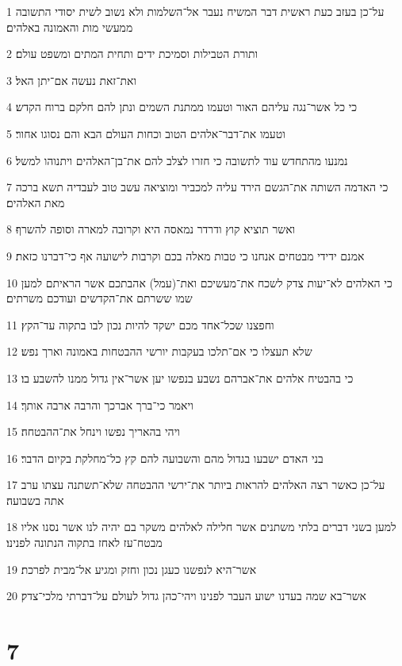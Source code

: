\par 1 על־כן בעזב כעת ראשית דבר המשיח נעבר אל־השלמות ולא נשוב לשית יסודי התשובה ממעשי מות והאמונה באלהים׃
\par 2 ותורת הטבילות וסמיכת ידים ותחית המתים ומשפט עולם׃
\par 3 ואת־זאת נעשה אם־יתן האל׃
\par 4 כי כל אשר־נגה עליהם האור וטעמו ממתנת השמים ונתן להם חלקם ברוח הקדש׃
\par 5 וטעמו את־דבר־אלהים הטוב וכחות העולם הבא והם נסוגו אחור׃
\par 6 נמנעו מהתחדש עוד לתשובה כי חזרו לצלב להם את־בן־האלהים ויתנוהו למשל׃
\par 7 כי האדמה השותה את־הגשם הירד עליה למכביר ומוציאה עשב טוב לעבדיה תשא ברכה מאת האלהים׃
\par 8 ואשר תוציא קוץ ודרדר נמאסה היא וקרובה למארה וסופה להשרף׃
\par 9 אמנם ידידי מבטחים אנחנו כי טבות מאלה בכם וקרבות לישועה אף כי־דברנו כזאת׃
\par 10 כי האלהים לא־יעות צדק לשכח את־מעשיכם ואת־(עמל) אהבתכם אשר הראיתם למען שמו ששרתם את־הקדשים ועודכם משרתים׃
\par 11 וחפצנו שכל־אחד מכם ישקד להיות נכון לבו בתקוה עד־הקץ׃
\par 12 שלא תעצלו כי אם־תלכו בעקבות יורשי ההבטחות באמונה וארך נפש׃
\par 13 כי בהבטיח אלהים את־אברהם נשבע בנפשו יען אשר־אין גדול ממנו להשבע בו׃
\par 14 ויאמר כי־ברך אברכך והרבה ארבה אותך׃
\par 15 ויהי בהאריך נפשו וינחל את־ההבטחה׃
\par 16 בני האדם ישבעו בגדול מהם והשבועה להם קץ כל־מחלקת בקיום הדבר׃
\par 17 על־כן כאשר רצה האלהים להראות ביותר את־ירשי ההבטחה שלא־תשתנה עצתו ערב אתה בשבועה׃
\par 18 למען בשני דברים בלתי משתנים אשר חלילה לאלהים משקר בם יהיה לנו אשר נסנו אליו מבטח־עז לאחז בתקוה הנתונה לפנינו׃
\par 19 אשר־היא לנפשנו כעגן נכון וחזק ומגיע אל־מבית לפרכת׃
\par 20 אשר־בא שמה בעדנו ישוע העבר לפנינו ויהי־כהן גדול לעולם על־דברתי מלכי־צדק׃

\chapter{7}

